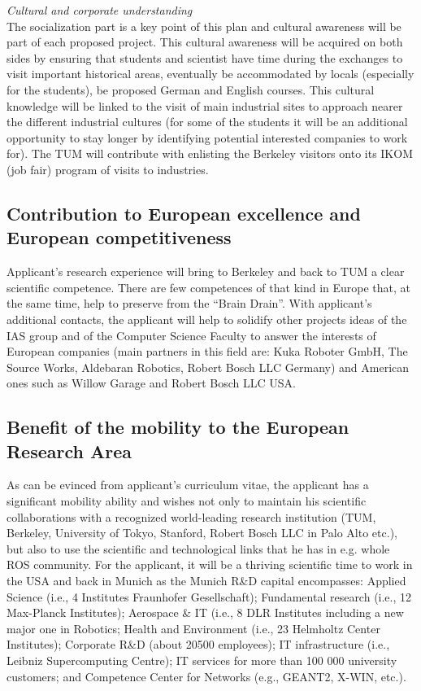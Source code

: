 \emph{Cultural  and corporate understanding}\\
The socialization  part is a
key point  of this plan  and cultural awareness  will be part  of each
proposed  project. This cultural  awareness will  be acquired  on both
sides by  ensuring that  students and scientist  have time  during the
exchanges   to  visit  important   historical  areas,   eventually  be
accommodated  by locals  (especially  for the  students), be  proposed
German and English courses. This  cultural knowledge will be linked to
the visit  of main industrial  sites to approach nearer  the different
industrial cultures (for some of the students it will be an additional
opportunity  to  stay   longer  by  identifying  potential  interested
companies to  work for).  The TUM will  contribute with  enlisting the
Berkeley visitors onto its IKOM (job fair) program of visits to industries.

\subsection{Contribution to European excellence and European competitiveness}
Applicant's  research experience  will  bring to  Berkeley and back  to TUM 
a clear scientific  competence. There are few competences of  that kind in 
Europe that, at  the same time, help to preserve  from the ``Brain Drain''.  
With applicant's additional contacts, the applicant will help to
solidify  other projects  ideas of  the  IAS group and  of the  Computer
Science Faculty  to   answer  the   interests  of  European   companies  (main
partners in this field are: Kuka Roboter GmbH, The Source
Works, Aldebaran  Robotics, Robert Bosch LLC Germany) and  American ones such as 
Willow Garage and Robert Bosch LLC USA.

\subsection{Benefit of the mobility to the European Research Area} 
As  can be  evinced from  applicant's curriculum  vitae, the applicant  
has  a significant mobility  ability  and  wishes  not  only to  maintain  his  scientific
collaborations  with a  recognized world-leading  research institution
(TUM, Berkeley, University of Tokyo, Stanford, Robert Bosch LLC in Palo
Alto etc.), but also  to use the  scientific and  technological links
that he has in e.g. whole ROS community. For the applicant, it will  be 
a thriving scientific time to work in  the USA and back in Munich as  
the Munich R\&D capital encompasses:   Applied   Science   (i.e.,  4   Institutes   Fraunhofer
Gesellschaft); Fundamental research  (i.e., 12 Max-Planck Institutes);
Aerospace \&  IT (i.e., 8 DLR  Institutes including a new  major one in
Robotics;   Health  and   Environment  (i.e.,   23   Helmholtz  Center
Institutes); Corporate R\&D  (about 20500 employees); IT infrastructure
(i.e., Leibniz  Supercomputing Centre); IT services for  more than 100
000 university  customers; and  Competence Center for  Networks (e.g.,
GEANT2, X-WIN,  etc.).  

